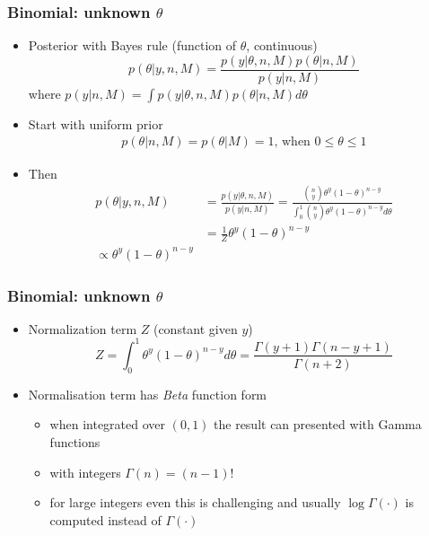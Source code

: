 \documentclass[10pt]{beamer}
\begin{document}
\begin{frame}
  \frametitle{Binomial: unknown $\theta$}

  \begin{itemize}
  \item Posterior with Bayes rule (function of $\theta$, continuous)
    \begin{equation*}
      p(\theta|y,n,M)=\frac{p(y|\theta,n,M)p(\theta|n,M)}{p(y|n,M)}
    \end{equation*}
    \pause
    where $p(y|n,M)=\int p(y|\theta,n,M)p(\theta|n,M) d\theta$
  \item<3-> Start with uniform prior
    \begin{align*}
      p(\theta|n,M)=p(\theta|M)=1,\, \text{when}\,\, 0\leq\theta\leq 1
    \end{align*}
  \item<4-> Then
    \begin{align*}
      p(\theta|y,n,M)&=\frac{p(y|\theta,n,M)}{p(y|n,M)}
      =\frac{\binom{n}{y} \theta^y(1-\theta)^{n-y}}{\int_0^1
        \binom{n}{y} \theta^y(1-\theta)^{n-y} d\theta} \\
        &=\frac{1}{Z}\theta^y(1-\theta)^{n-y} \\
        \propto \theta^y(1-\theta)^{n-y}
    \end{align*}
  \end{itemize}

\end{frame}

\begin{frame}
  \frametitle{Binomial: unknown $\theta$}

  \begin{itemize}
  \item Normalization term $Z$ (constant given $y$)
    \begin{equation*}
      Z= \int_0^1 \theta^y(1-\theta)^{n-y} d\theta = \frac{\Gamma(y+1)\Gamma(n-y+1)}{\Gamma(n+2)}
    \end{equation*}
  \item Normalisation term has \emph{Beta} function form
    \begin{itemize}
    \item when integrated over $(0,1)$
      the result can presented with Gamma functions
    \item with integers  $\Gamma(n)=(n-1)!$
    \item for large integers even this is challenging and usually
      $\log \Gamma(\cdot)$ is computed instead of $\Gamma(\cdot)$
    \end{itemize}
  \end{itemize}

\end{frame}
\end{document}
